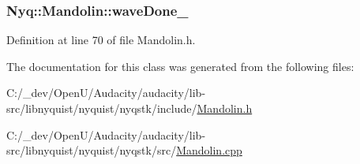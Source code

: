 \subsubsection[{\texorpdfstring{wave\+Done\+\_\+}{waveDone_}}]{ Nyq\+::\+Mandolin\+::wave\+Done\+\_\+\hspace{0.3cm}{\ttfamily [protected]}}\hypertarget{class_nyq_1_1_mandolin_aa072337723a7cb0bbcac8c3874d80d3b}{}\label{class_nyq_1_1_mandolin_aa072337723a7cb0bbcac8c3874d80d3b}


Definition at line 70 of file Mandolin.\+h.



The documentation for this class was generated from the following files\+:\begin{DoxyCompactItemize}
\item 
C\+:/\+\_\+dev/\+Open\+U/\+Audacity/audacity/lib-\/src/libnyquist/nyquist/nyqstk/include/\hyperlink{_mandolin_8h}{Mandolin.\+h}\item 
C\+:/\+\_\+dev/\+Open\+U/\+Audacity/audacity/lib-\/src/libnyquist/nyquist/nyqstk/src/\hyperlink{_mandolin_8cpp}{Mandolin.\+cpp}\end{DoxyCompactItemize}
